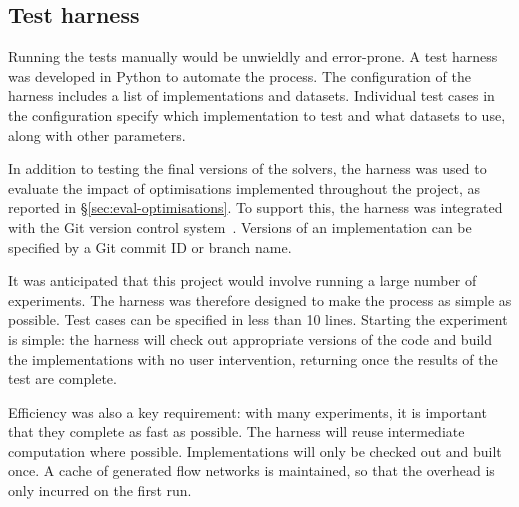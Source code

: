 
\subsection{Test harness}

Running the tests manually would be unwieldly and error-prone. A test harness was developed in Python to automate the process. The configuration of the harness includes a list of implementations and datasets. Individual test cases in the configuration specify which implementation to test and what datasets to use, along with other parameters.

In addition to testing the final versions of the solvers, the harness was used to evaluate the impact of optimisations implemented throughout the project, as reported in \S\ref{sec:eval-optimisations}. To support this, the harness was integrated with the Git version control system~\cite{GitWWW}. Versions of an implementation can be specified by a Git commit ID or branch name.

It was anticipated that this project would involve running a large number of experiments. The harness was therefore designed to make the process as simple as possible. Test cases can be specified in less than 10 lines. Starting the experiment is simple: the harness will check out appropriate versions of the code and build the implementations with no user intervention, returning once the results of the test are complete.

Efficiency was also a key requirement: with many experiments, it is important that they complete as fast as possible. The harness will reuse intermediate computation where possible. Implementations will only be checked out and built once. A cache of generated flow networks is maintained\footnotemark, so that the overhead is only incurred on the first run.

